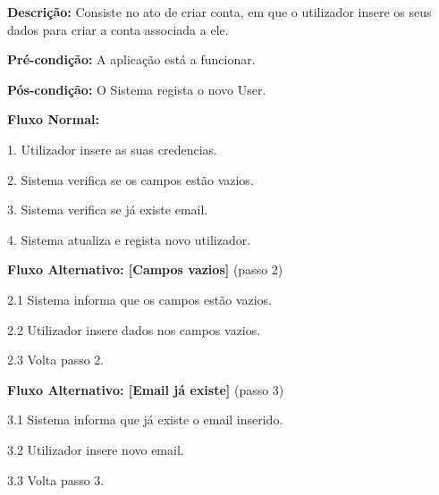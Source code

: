 \textbf{Descrição:}  Consiste no ato de criar conta, em que o utilizador insere os seus dados para criar a conta associada a ele.

\textbf{Pré-condição:} A aplicação está a funcionar.

\textbf{Pós-condição:} O Sistema regista o novo User.


\textbf{Fluxo Normal:}

1. Utilizador insere as suas credencias.

2. Sistema verifica se os campos estão vazios.

3. Sistema verifica se já existe email.

4. Sistema atualiza e regista novo utilizador.

\textbf{Fluxo Alternativo: [Campos vazios]} (passo 2)

2.1 Sistema informa que os campos estão vazios.

2.2 Utilizador insere dados nos campos vazios.

2.3 Volta passo 2.


\textbf{Fluxo Alternativo: [Email já existe]} (passo 3)

3.1 Sistema informa que já existe o email inserido.

3.2 Utilizador insere novo email.

3.3 Volta passo 3.